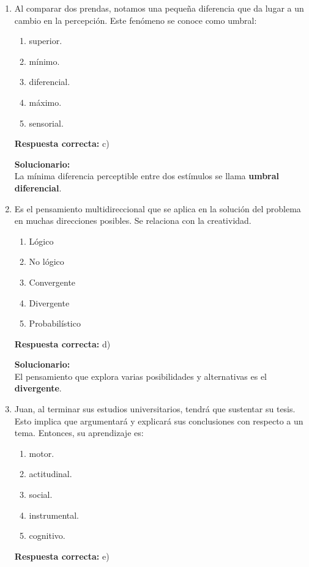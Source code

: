 \begin{enumerate}

	
	\item Al comparar dos prendas, notamos una pequeña diferencia que da lugar a un cambio en la percepción. Este fenómeno se conoce como umbral:
	\begin{enumerate}[label=\alph*)]
		\item superior.
		\item mínimo.
		\item diferencial.
		\item máximo.
		\item sensorial.
	\end{enumerate}
	\textbf{Respuesta correcta:} c)
	
	\vspace{2mm}
	\textbf{Solucionario:}\\
	La mínima diferencia perceptible entre dos estímulos se llama \textbf{umbral diferencial}.
	
	\vspace{6mm}
	
	\item Es el pensamiento multidireccional que se aplica en la solución del problema en muchas direcciones posibles. Se relaciona con la creatividad.
	\begin{enumerate}[label=\alph*)]
		\item Lógico
		\item No lógico
		\item Convergente
		\item Divergente
		\item Probabilístico
	\end{enumerate}
	\textbf{Respuesta correcta:} d)
	
	\vspace{2mm}
	\textbf{Solucionario:}\\
	El pensamiento que explora varias posibilidades y alternativas es el \textbf{divergente}.
	
	\vspace{6mm}
	
	\item Juan, al terminar sus estudios universitarios, tendrá que sustentar su tesis. Esto implica que argumentará y explicará sus conclusiones con respecto a un tema. Entonces, su aprendizaje es:
	\begin{enumerate}[label=\alph*)]
		\item motor.
		\item actitudinal.
		\item social.
		\item instrumental.
		\item cognitivo.
	\end{enumerate}
	\textbf{Respuesta correcta:} e)
	

\end{enumerate}
